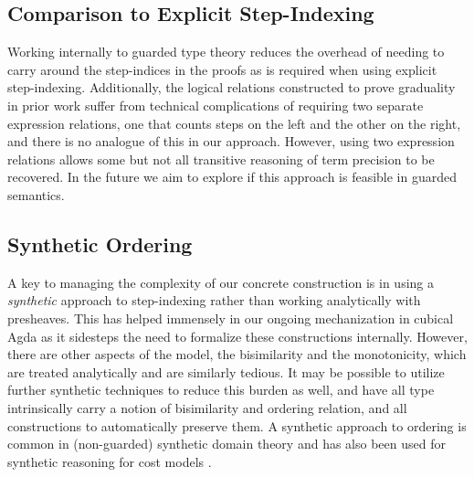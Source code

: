 \begin{comment}
Besides the abstract model and its concrete construction on dynamic type, 
we will also formalize the adequacy result in \ref{sec:appendix-adequacy}, 
which involves clock quantification of the lift monad, the weak bisim 
relation, and the lock-step error ordering. In order to prove adequacy, 
we will first prove that the global lift of X is isomorphic to Delay(1 + X)
whether X is clock-irrelevant or not. Then, we aim to prove the equivalence 
between the global lock-step error ordering and the error ordering observed 
in Delay(1 + X) and equivalence between the global weak bisimilarity 
relation and the weak bisimilarity relation on Delay(1 + X). We have 
finished some prerequisite proofs on clock quantification and postulated 
some theorems on clock globalization.
\end{comment}

\subsection{Comparison to Explicit Step-Indexing}

Working internally to guarded type theory reduces the overhead of
needing to carry around the step-indices in the proofs as is required
when using explicit step-indexing. Additionally, the logical relations
constructed to prove graduality in prior work \cite{new-ahmed2018,new-licata-ahmed2019,new-giovannini-licata-2022} suffer
from technical complications of requiring two separate expression
relations, one that counts steps on the left and the other on the
right, and there is no analogue of this in our approach. However,
using two expression relations allows some but not all transitive
reasoning of term precision to be recovered. In the future we aim to
explore if this approach is feasible in guarded semantics.

\subsection{Synthetic Ordering}
A key to managing the complexity of our concrete construction is in
using a \emph{synthetic} approach to step-indexing rather than working
analytically with presheaves. This has helped immensely in our ongoing
mechanization in cubical Agda as it sidesteps the need to formalize
these constructions internally. 
%
However, there are other aspects of the model, the bisimilarity and
the monotonicity, which are treated analytically and are similarly
tedious.
%
It may be possible to utilize further synthetic techniques to reduce
this burden as well, and have all type intrinsically carry a notion of
bisimilarity and ordering relation, and all constructions to
automatically preserve them.
%
A synthetic approach to ordering is common in (non-guarded) synthetic
domain theory and has also been used for synthetic reasoning for cost
models \cite{fiore_1997,GrodinNSH24}.

